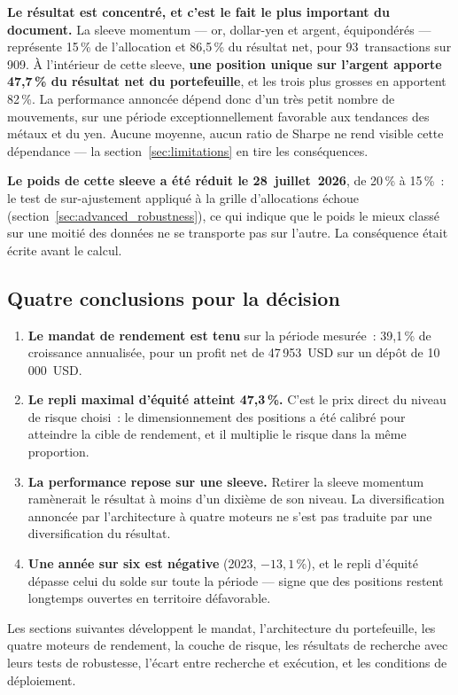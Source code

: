 \begin{insightbox}
\textbf{Le résultat est concentré, et c'est le fait le plus important du document.} La sleeve momentum --- or, dollar-yen et argent, équipondérés --- représente 15\,\% de l'allocation et 86,5\,\% du résultat net, pour 93~transactions sur 909. À l'intérieur de cette sleeve, \textbf{une position unique sur l'argent apporte 47,7\,\% du résultat net du portefeuille}, et les trois plus grosses en apportent 82\,\%. La performance annoncée dépend donc d'un très petit nombre de mouvements, sur une période exceptionnellement favorable aux tendances des métaux et du yen. Aucune moyenne, aucun ratio de Sharpe ne rend visible cette dépendance --- la section~\ref{sec:limitations} en tire les conséquences.

\textbf{Le poids de cette sleeve a été réduit le 28~juillet~2026}, de 20\,\% à 15\,\%~: le test de sur-ajustement appliqué à la grille d'allocations échoue (section~\ref{sec:advanced_robustness}), ce qui indique que le poids le mieux classé sur une moitié des données ne se transporte pas sur l'autre. La conséquence était écrite avant le calcul.
\end{insightbox}



\subsection*{Quatre conclusions pour la décision}

\begin{enumerate}
\item \textbf{Le mandat de rendement est tenu} sur la période mesurée~: 39,1\,\% de croissance annualisée, pour un profit net de 47\,953~USD sur un dépôt de 10\,000~USD.
\item \textbf{Le repli maximal d'équité atteint 47,3\,\%.} C'est le prix direct du niveau de risque choisi~: le dimensionnement des positions a été calibré pour atteindre la cible de rendement, et il multiplie le risque dans la même proportion.
\item \textbf{La performance repose sur une sleeve.} Retirer la sleeve momentum ramènerait le résultat à moins d'un dixième de son niveau. La diversification annoncée par l'architecture à quatre moteurs ne s'est pas traduite par une diversification du résultat.
\item \textbf{Une année sur six est négative} (2023, $-13{,}1$\,\%), et le repli d'équité dépasse celui du solde sur toute la période --- signe que des positions restent longtemps ouvertes en territoire défavorable.
\end{enumerate}



Les sections suivantes développent le mandat, l'architecture du portefeuille, les quatre moteurs de rendement, la couche de risque, les résultats de recherche avec leurs tests de robustesse, l'écart entre recherche et exécution, et les conditions de déploiement.
